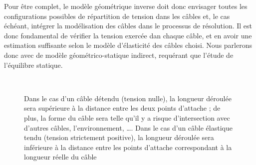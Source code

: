 Pour être complet, le modèle géométrique inverse doit donc envisager toutes les configurations possibles de répartition de tension dans les câbles et, le cas échéant, intégrer la modélisation des câbles dans le processus de résolution. Il est donc fondamental de vérifier la tension exercée dan chaque câble, et en avoir une estimation suffisante selon le modèle d'élasticité des câbles choisi. Nous parlerons donc avec \cite{Carricato-2010-06b} de modèle géométrico-statique indirect, requérant que l'étude de l'équilibre statique.

\begin{figure}[!ht]
  \centering
       \hfill
     \\
    \caption{\footnotesize{Dans le cas d'un câble détendu (tension nulle), la longueur déroulée sera supérieure à la distance entre les deux points d'attache ; de plus, la forme du câble sera telle qu'il y a risque d'intersection avec d'autres câbles, l'environnement, \dots. Dans le cas d'un câble élastique tendu (tension strictement positive), la longueur déroulée sera inférieure à la distance entre les points d'attache correspondant à la longueur réelle du câble}}
\label{intro:fig6}
\end{figure}

